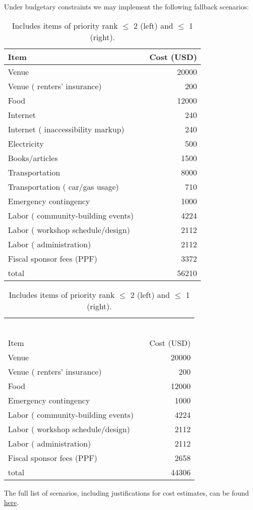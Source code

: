 \documentclass[10pt]{article}
\begin{document}
Under budgetary constraints we may implement the following fallback scenarios:

\begin{table}[h]
\begin{tabular}{llr}
Item &  & Cost (USD) \\ \hline
Venue &  & 20000 \\
Venue ( renters' insurance) &  & 200 \\
Food &  & 12000 \\
Internet &  & 240 \\
Internet ( inaccessibility markup) &  & 240 \\
Electricity &  & 500 \\
Books/articles &  & 1500 \\
Transportation &  & 8000 \\
Transportation ( car/gas usage) &  & 710 \\
Emergency contingency &  & 1000 \\
Labor ( community-building events) &  & 4224 \\
Labor ( workshop schedule/design) &  & 2112 \\
Labor ( administration) &  & 2112 \\
Fiscal sponsor fees (PPF) &  & 3372 \\ \hline
total &  & 56210
\end{tabular}
\begin{tabular}{llr}
 & & \\
 & & \\
 & & \\
 & & \\
 & & \\
 & & \\
Item &  & Cost (USD) \\ \hline
Venue &  & 20000 \\
Venue ( renters' insurance) &  & 200 \\
Food &  & 12000 \\
Emergency contingency &  & 1000 \\
Labor ( community-building events) &  & 4224 \\
Labor ( workshop schedule/design) &  & 2112 \\
Labor ( administration) &  & 2112 \\
Fiscal sponsor fees (PPF) &  & 2658 \\ \hline
total &  & 44306
\end{tabular}
\caption{Includes items of priority rank $\leq$ 2 (left) and $\leq$ 1 (right).}\label{caplab}
\end{table}

The full list of scenarios, including justifications for cost estimates, can be found \href{https://raw.githubusercontent.com/let-me-think/let-me-think.github.io/master/ScholarshipWorkshop/budget/budget_projection.pdf}{here}.
\end{document}
